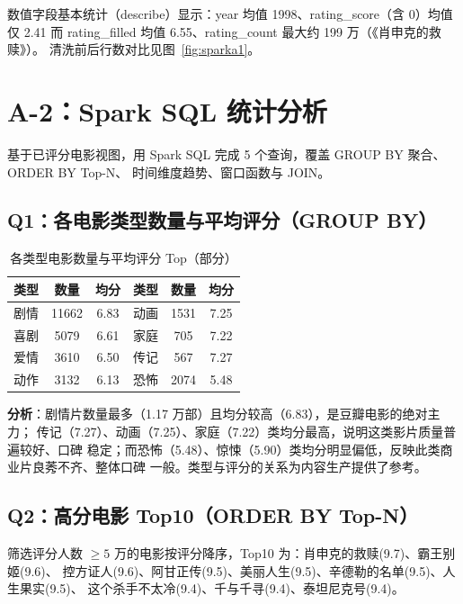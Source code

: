 数值字段基本统计（describe）显示：year 均值 1998、rating\_score（含 0）均值仅 2.41
而 rating\_filled 均值 6.55、rating\_count 最大约 199 万（《肖申克的救赎》）。
清洗前后行数对比见图~\ref{fig:sparka1}。


\section{A-2：Spark SQL 统计分析}

基于已评分电影视图，用 Spark SQL 完成 5 个查询，覆盖 GROUP BY 聚合、ORDER BY Top-N、
时间维度趋势、窗口函数与 JOIN。

\subsection{Q1：各电影类型数量与平均评分（GROUP BY）}

\begin{table}[htbp]\centering
\caption{各类型电影数量与平均评分 Top（部分）}\label{tab:q1}
\begin{tabular}{lcc lcc}
\toprule
类型 & 数量 & 均分 & 类型 & 数量 & 均分 \\
\midrule
剧情 & 11662 & 6.83 & 动画 & 1531 & 7.25 \\
喜剧 & 5079  & 6.61 & 家庭 & 705  & 7.22 \\
爱情 & 3610  & 6.50 & 传记 & 567  & 7.27 \\
动作 & 3132  & 6.13 & 恐怖 & 2074 & 5.48 \\
\bottomrule
\end{tabular}
\end{table}

\textbf{分析}：剧情片数量最多（1.17 万部）且均分较高（6.83），是豆瓣电影的绝对主力；
传记（7.27）、动画（7.25）、家庭（7.22）类均分最高，说明这类影片质量普遍较好、口碑
稳定；而恐怖（5.48）、惊悚（5.90）类均分明显偏低，反映此类商业片良莠不齐、整体口碑
一般。类型与评分的关系为内容生产提供了参考。

\subsection{Q2：高分电影 Top10（ORDER BY Top-N）}

筛选评分人数 $\geq 5$ 万的电影按评分降序，Top10 为：肖申克的救赎(9.7)、霸王别姬(9.6)、
控方证人(9.6)、阿甘正传(9.5)、美丽人生(9.5)、辛德勒的名单(9.5)、人生果实(9.5)、
这个杀手不太冷(9.4)、千与千寻(9.4)、泰坦尼克号(9.4)。

